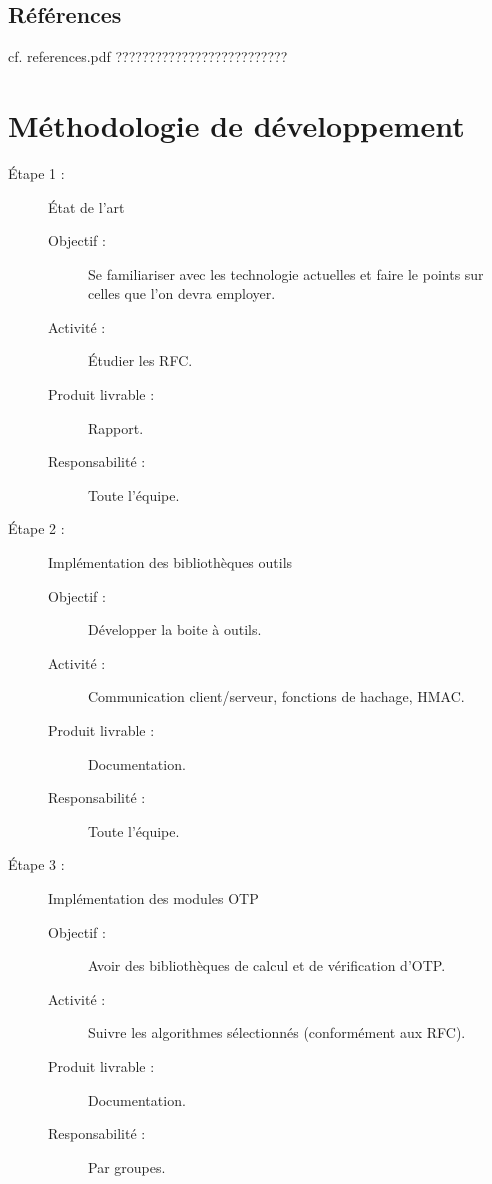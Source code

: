 \documentclass{../../res/univ-projet}
\begin{document}
	\subsection{Références} 
	cf. references.pdf ??????????????????????????
\newpage

\section{Méthodologie de développement}
	\begin{description}
	    \item [Étape 1 :] État de l'art
		    \begin{description}
		        \item [Objectif :] Se familiariser avec les technologie actuelles et faire le points sur celles que l'on devra employer.
		        \item [Activité :] Étudier les RFC.
		        \item [Produit livrable :] Rapport.
		        \item [Responsabilité :] Toute l'équipe.
            \end{description}
	    \item [Étape 2 :] Implémentation des bibliothèques outils
		    \begin{description}
		        \item [Objectif :] Développer la boite à outils.
		        \item [Activité :] Communication client/serveur, fonctions de hachage, HMAC.
		        \item [Produit livrable :] Documentation.
		        \item [Responsabilité :] Toute l'équipe.
		    \end{description}
	    \item [Étape 3 :] Implémentation des modules OTP
		    \begin{description}
		        \item [Objectif :] Avoir des bibliothèques de calcul et de vérification d'OTP.
		        \item [Activité :] Suivre les algorithmes sélectionnés (conformément aux RFC).
		        \item [Produit livrable :] Documentation.
		        \item [Responsabilité :] Par groupes.
		    \end{description}

\end{description}
\end{document}
